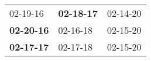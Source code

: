 \begin{supertabular}{p{0.33\columnwidth}p{0.33\columnwidth}p{0.33\columnwidth}}
          02-19-16\textsuperscript{} &  \textbf{02-18-17\textsuperscript{}} &  02-14-20\textsuperscript{} \\
 \textbf{02-20-16\textsuperscript{}} &           02-16-18\textsuperscript{} &  02-15-20\textsuperscript{} \\
 \textbf{02-17-17\textsuperscript{}} &           02-17-18\textsuperscript{} &  02-15-20\textsuperscript{} \\
\end{supertabular}
